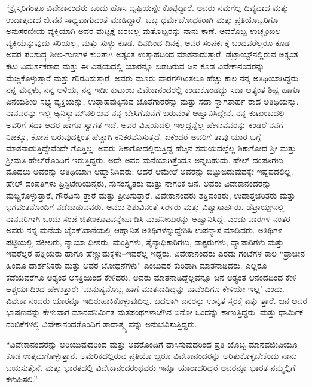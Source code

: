 “ಕ್ರೈಸ್ತರಿಗಂತೂ ವಿವೇಕಾನಂದರು ಒಂದು ಹೊಸ ದೃಷ್ಟಿಯನ್ನೇ ಕೊಟ್ಟಿದ್ದಾರೆ. ಅವರು ನಮಗೆಲ್ಲ ದಿವ್ಯವಾದ ಮತ್ತು ಉದಾತ್ತವಾದ ಜೀವನ ಸಾಧ್ಯವಾಗುವಂತೆ ಮಾಡಿದ್ದಾರೆ. ಒಬ್ಬ ಧರ್ಮಬೋಧಕರಾಗಿ ಮತ್ತು ಪ್ರತಿಯೊಬ್ಬರಿಗೂ ಅನುಸರಣೀಯ ವ್ಯಕ್ತಿಯಾಗಿ ಅವರ ಮಟ್ಟಕ್ಕೆ ಬರಬಲ್ಲ ಮತ್ತೊಬ್ಬರನ್ನು ನಾನು ಕಾಣೆ. ಅವರೊಬ್ಬ ಉಚ್ಛೃಂಖಲ ವ್ಯಕ್ತಿಯೆನ್ನುವುದು ಸರಿಯಲ್ಲ, ಮತ್ತು ಸುಳ್ಳು ಕೂಡ. ದಿನದಿಂದ ದಿನಕ್ಕೆ, ಅವರ ಸಂಪರ್ಕಕ್ಕೆ ಬಂದವರೆಲ್ಲರೂ ಕೂಡ ಅವರ ಪರಿಶುದ್ಧ ಶೀಲ-ಗುಣಗಳ ಕುರಿತಾಗಿ ಅತ್ಯಂತ ಉತ್ಸಾಹದಿಂದ ಮಾತನಾಡುತ್ತಾರೆ. ಡೆಟ್ರಾಯ್ಟ್​ನಲ್ಲಿರುವ ಅತ್ಯಂತ ಕಟು ವಿಮರ್ಶಕರಾದ ಮತ್ತು ಈ ವಿಷಯದಲ್ಲಿ ಯಾರನ್ನೂ ಬಿಡದಿರುವ ಜನ ಕೂಡ ವಿವೇಕಾನಂದರನ್ನು ಮೆಚ್ಚಿಕೊಳ್ಳುತ್ತಾರೆ ಮತ್ತು ಗೌರವಿಸುತ್ತಾರೆ. ಅವರು ಮೂರು ವಾರಗಳಿಗಿಂತಲೂ ಹೆಚ್ಚು ಕಾಲ ನನ್ನ ಅತಿಥಿಯಾಗಿದ್ದರು. ನನ್ನ ಮಕ್ಕಳು, ನನ್ನ ಅಳಿಯ, ನನ್ನ ಇಡೀ ಕುಟುಂಬ ವಿವೇಕಾನಂದರಲ್ಲಿ ಕಂಡುಕೊಂಡದ್ದು ಸದಾ ಅತ್ಯಂತ ಶಿಷ್ಟ ಹಾಗೂ ವಿನಯಶೀಲ ಸಭ್ಯ ವ್ಯಕ್ತಿಯನ್ನು, ಉತ್ಸಾಹವುಕ್ಕಿಸುವ ಜೊತೆಗಾರರನ್ನು ಮತ್ತು ಸದಾ ಸ್ವಾಗತಾರ್ಹ ರಾದ ಅತಿಥಿಯನ್ನು. ನಾನವರನ್ನು ಇಲ್ಲಿ ಆ್ಯನಿಸ್ಕ್ಟಾಮ್​ನಲ್ಲಿರುವ ನನ್ನ ಬೇಸಿಗೆಮನೆಗೆ ಬರುವಂತೆ ಆಹ್ವಾನಿಸಿದ್ದೇನೆ. ನನ್ನ ಕುಟುಂಬದಲ್ಲಿ ಅವರಿಗೆ ಸದಾ ಆದರ ಹಾಗೂ ಸ್ವಾಗತ ಇದೆ. ಅವರ ವಿಷಯದಲ್ಲಿ ಇಲ್ಲದ್ದನ್ನೆಲ್ಲ ಹೇಳುವವರನ್ನು ಕಂಡರೆ ನನಗೆ ನಿಜಕ್ಕೂ, ಕೋಪ ಬರುವುದಕ್ಕಿಂತ ಹೆಚ್ಚಾಗಿ ಕನಿಕರವೆನಿಸುತ್ತದೆ. ಏಕೆಂದರೆ ಅವರಿಗೆ ತಾವು ಯಾರ ಬಗ್ಗೆ ಮಾತನಾಡುತ್ತಿದ್ದೇವೆಂದೇ ಗೊತ್ತಿಲ್ಲ. ಅವರು ಶಿಕಾಗೋದಲ್ಲಿರುತ್ತಿದ್ದ ಹೆಚ್ಚಿನ ಸಮಯದಲ್ಲೆಲ್ಲ ಶಿಕಾಗೋದ ಶ್ರೀ ಮತ್ತು ಶ್ರೀಮತಿ ಹೇಲ್​ರೊಂದಿಗೆ ಇರುತ್ತಿದ್ದರು. ಅದೇ ಅವರ ಮನೆಯಾಗಿತ್ತೆಂದೂ ಅನ್ನಬಹುದು. ಹೇಲ್ ದಂಪತಿಗಳು ಮೊದಲು ಅವರನ್ನು ಅತಿಥಿಯಾಗಿ ಆಹ್ವಾನಿಸಿದರು; ಆದರೆ ಆಮೇಲೆ ಅವರನ್ನು ಬಿಟ್ಟುಬಿಡುವುದಕ್ಕೇ ಇಷ್ಟಪಡಲಿಲ್ಲ. ಹೇಲ್ ದಂಪತಿಗಳು ಪ್ರಿಸ್ಟಿಟೇರಿಯನ್ನರು, ಸುಸಂಸ್ಕೃತರು ಮತ್ತು ನಾಗರಿಕ ಜನ. ಅವರು ವಿವೇಕಾನಂದರನ್ನು ಮೆಚ್ಚಿಕೊಳ್ಳುತ್ತಾರೆ, ಗೌರವಿಸು ತ್ತಾರೆ ಮತ್ತು ಪ್ರೀತಿಸುತ್ತಾರೆ. ವಿವೇಕಾನಂದರು ಶಕ್ತಿವಂತರು, ಉದಾತ್ತಚರಿತರು ಮತ್ತು ಭಗವಂತನೊಂದಿಗೆ ನಡೆದಾಡುವವರು. ಅವರು ಶಿಶುವಿನಂತೆ ಸರಳರು ಮತ್ತು ವಿಶ್ವಾಸಾರ್ಹರು. ಡೆಟ್ರಾಯ್ಟ್​ನಲ್ಲಿ ನಾನವರಿಗಾಗಿ ಒಂದು ಸಂಜೆ ಔತಣಕೂಟವನ್ನೇರ್ಪಡಿಸಿ ಮಹನೀಯರನ್ನು ಆಹ್ವಾನಿಸಿದ್ದೆ. ಎರಡು ವಾರಗಳ ನಂತರ ಅವರು ನನ್ನ ಮನೆಯ ಬೈಠಕ್​ಖಾನೆಯಲ್ಲಿ ಆಹ್ವಾನಿತ ಅತಿಥಿಗಳನ್ನುದ್ದೇಶಿಸಿ ಉಪನ್ಯಾಸ ಮಾಡಿದರು. ಅತಿಥಿಗಳ ಪಟ್ಟಿಯಲ್ಲಿ ವಕೀಲರು, ನ್ಯಾಯಾ ಧೀಶರು, ಮಂತ್ರಿಗಳು, ಸೈನ್ಯಾಧಿಕಾರಿಗಳು, ಡಾಕ್ಟರುಗಳು, ವ್ಯಾಪಾರಿಗಳು ಮತ್ತು ಇವರೆಲ್ಲರ ಪತ್ನಿಯರು ಹಾಗೂ ಹೆಣ್ಣುಮಕ್ಕಳು–ಇವರೆಲ್ಲ ಇದ್ದರು. ವಿವೇಕಾನಂದರು ಎರಡು ಗಂಟೆಗಳ ಕಾಲ “ಪ್ರಾಚೀನ ಹಿಂದೂ ದಾರ್ಶನಿಕರು ಮತ್ತು ಅವರ ಬೋಧನೆಗಳು” ಎಂಬುದರ ಕುರಿತಾಗಿ ಮಾತನಾಡಿದರು. ಎಲ್ಲರೂ ಕಡೆಯವರೆಗೂ ಅತ್ಯಂತ ಆಸಕ್ತಿಯಿಂದ ಕೇಳಿದರು. ಅವರು ಮಾತನಾಡಿದ್ದೆಲ್ಲವನ್ನೂ ಜನ ಅತ್ಯಂತ ಆನಂದದಿಂದ ಕೇಳಿ ಆಶ್ಚರ್ಯದಿಂದ ಹೇಳುತ್ತಾರೆ: ‘ಮನುಷ್ಯನೊಬ್ಬ ಹಾಗೆ ಮಾತನಾಡಿದ್ದನ್ನು ನಾವೆಂದಿಗೂ ಕೇಳಿಯೇ ಇಲ್ಲ’ ಎಂದು. ವಿವೇಕಾ ನಂದರು ಯಾರನ್ನೂ ಇದಿರುಹಾಕಿಕೊಳ್ಳುವುದಿಲ್ಲ. ಬದಲಾಗಿ ಜನರನ್ನು ಉನ್ನತ ಸ್ತರಕ್ಕೆ ಎತ್ತು ತ್ತಾರೆ. ಜನ ಅವರ ಭಾಷಣವನ್ನು ಕೇಳುವಾಗ ಮಾನವನಿರ್ಮಿತ ಮತಪಂಥಗಳಾಚೆಗಿನ ಏನೋ ಒಂದನ್ನು ಕಾಣುತ್ತಿದ್ದರು. ಮತ್ತು ಧಾರ್ಮಿಕ ನಂಬಿಕೆಗಳಲ್ಲಿ ವಿವೇಕಾನಂದರೊಂದಿಗೆ ತಾದಾತ್ಮ್ಯ ವನ್ನು ಅನುಭವಿಸುತ್ತಿದ್ದರು.

“ವಿವೇಕಾನಂದರನ್ನು ಅರಿಯುವುದರಿಂದ ಮತ್ತು ಅವರೊಂದಿಗೆ ವಾಸಿಸುವುದರಿಂದ ಪ್ರತಿ ಯೊಬ್ಬ ಮಾನವಜೀವಿಯೂ ಕೂಡ ಉತ್ತಮಗೊಳ್ಳುತ್ತಾನೆ. ಅಮೆರಿಕದಲ್ಲಿರುವ ಪ್ರತಿಯೊ ಬ್ಬರೂ ವಿವೇಕಾನಂದರನ್ನು ಅರಿತುಕೊಳ್ಳಬೇಕೆಂದು ನಾನು ಬಯಸುತ್ತೇನೆ. ಮತ್ತು ಭಾರತದಲ್ಲಿ ವಿವೇಕಾನಂದರಂಥವರು ಇನ್ನೂ ಯಾರಾದರಿದ್ದರೆ ಅವರನ್ನೂ ಭಾರತ ನಮ್ಮಲ್ಲಿಗೆ ಕಳುಹಿಸಲಿ.”

